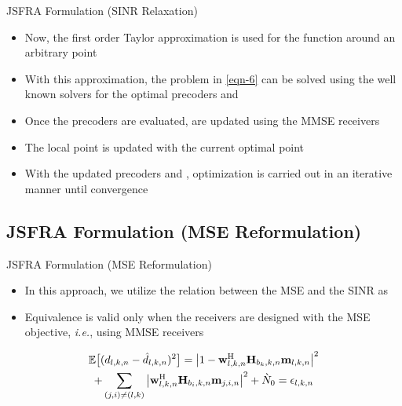 \documentclass[10pt]{beamer}
\begin{document}
\begin{frame}{\acs{JSFRA} Formulation (\acs{SINR} Relaxation)}
\begin{itemize}
\item Now, the first order Taylor approximation is used for the function  around an arbitrary point 
\item With this approximation, the problem in \eqref{eqn-6} can be solved using the well known solvers for the optimal precoders and 
\item Once the precoders  are evaluated,  are updated using the \acs{MMSE} receivers
\item The local point  is updated with the current optimal point 
\item With the updated precoders and , optimization is carried out in an iterative manner until convergence
\end{itemize}
\end{frame}

\subsection{\acs{JSFRA} Formulation (\acs{MSE} Reformulation)}

\begin{frame}{\acs{JSFRA} Formulation (\acs{MSE} Reformulation)}
	\begin{itemize}
		\item In this approach, we utilize the relation between the \acs{MSE} and the \acs{SINR} as 
		\item Equivalence is valid only when the receivers are designed with the \ac{MSE} objective, \textit{i.e.}, using \acs{MMSE} receivers
	\end{itemize}
	\begin{multline} \label{mse-error}
	\mathbb{E} \big [ ( d_{l,k,n} - \hat{d}_{l,k,n} )^2 \big ] = \left | 1 - \mathbf{w}_{l,k,n}^{\mathrm{H}} \mathbf{H}_{b_k,k,n} \mathbf{m}_{l,k,n} \right |^2 \\
		+ \sum_{{(j,i) \neq (l,k)}} \left | \mathbf{w}_{l,k,n}^{\mathrm{H}} \mathbf{H}_{b_i,k,n} \mathbf{m}_{j,i,n} \right |^2 + \grave{N}_0 = \epsilon_{l,k,n}
	\end{multline}
\end{frame}
\end{document}
